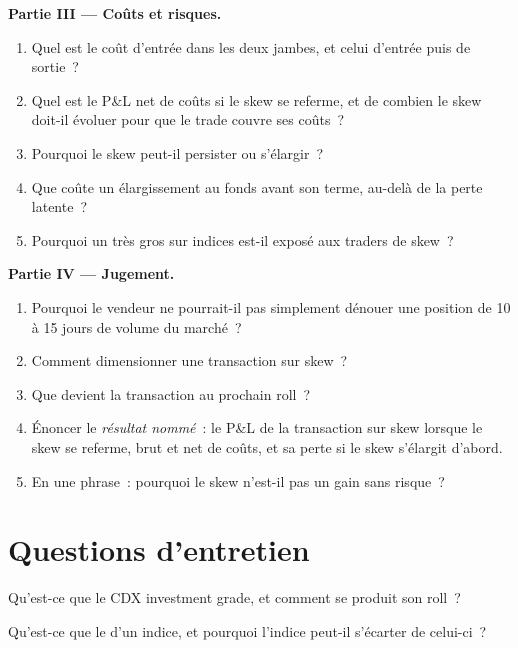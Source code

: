 \begin{problem}
\medskip\noindent\textbf{Partie III --- Coûts et risques.}
\begin{enumerate}[resume]
\item Quel est le coût d'entrée dans les deux jambes, et celui d'entrée puis de sortie~?
\item Quel est le P\&L net de coûts si le skew se referme, et de combien le skew doit-il
évoluer pour que le trade couvre ses coûts~?
\item Pourquoi le skew peut-il persister ou s'élargir~?
\item Que coûte un élargissement au fonds avant son terme, au-delà de la perte latente~?
\item Pourquoi un très gros  sur indices est-il exposé aux traders de skew~?
\end{enumerate}

\medskip\noindent\textbf{Partie IV --- Jugement.}
\begin{enumerate}[resume]
\item Pourquoi le vendeur ne pourrait-il pas simplement dénouer une position de 10 à 15 jours de
volume du marché~?
\item Comment dimensionner une transaction sur skew~?
\item Que devient la transaction au prochain roll~?
\item Énoncer le \emph{résultat nommé}~: le P\&L de la transaction sur skew lorsque le skew se referme,
brut et net de coûts, et sa perte si le skew s'élargit d'abord.
\item En une phrase~: pourquoi le skew n'est-il pas un gain sans risque~?
\end{enumerate}
\end{problem}

\section{Questions d'entretien}

\begin{interviewq}\label{iq:m2:credit-indices-and-tranches:1}
Qu'est-ce que le CDX investment grade, et comment se produit son roll~?
\end{interviewq}

\begin{interviewq}\label{iq:m2:credit-indices-and-tranches:2}
Qu'est-ce que le  d'un indice, et pourquoi l'indice peut-il s'écarter de celui-ci~?
\end{interviewq}

